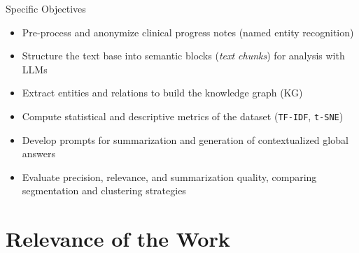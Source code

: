 \documentclass[9pt]{beamer}
\begin{document}

    \begin{frame}{Specific Objectives}
        \begin{itemize}
            \item Pre-process and anonymize clinical progress notes (named entity recognition)
            \item Structure the text base into semantic blocks (\textit{text chunks}) for analysis with LLMs
            \item Extract entities and relations to build the knowledge graph (KG)
            \item Compute statistical and descriptive metrics of the dataset (\texttt{TF-IDF}, \texttt{t-SNE})
            \item Develop prompts for summarization and generation of contextualized global answers
            \item Evaluate precision, relevance, and summarization quality, comparing segmentation and clustering strategies
        \end{itemize}
    \end{frame}

    \section{Relevance of the Work}
\end{document}
